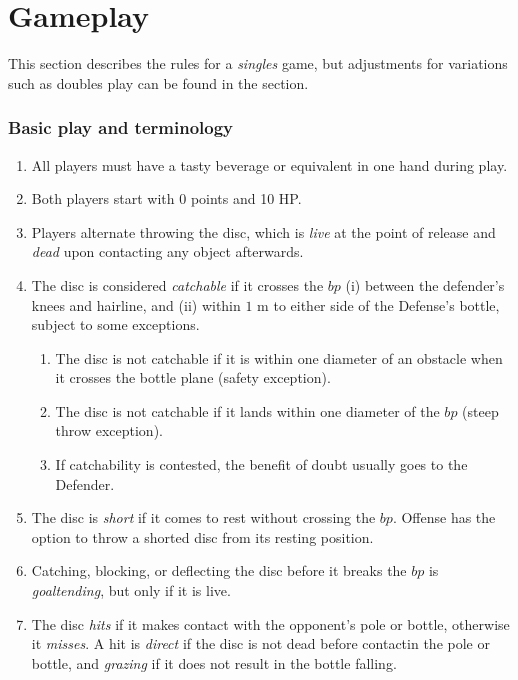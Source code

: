 \documentclass[11pt,letterpaper,twocolumn,english,DIV=calc]{scrartcl}
\begin{document}
\part*{Gameplay}

This section describes the rules for a \emph{singles} game, but adjustments for variations such as doubles play can be found in the  section.
	
\section{Basic play and terminology}
\begin{enumerate}
	\item All players must have a tasty beverage or equivalent in one hand during play.
	\item Both players start with 0 points and 10 HP.
	\item \label{enu:alternate_throws} Players alternate throwing the disc, which is \emph{live} at the point of release and \emph{dead} upon contacting any object afterwards.

	\item The disc is considered \emph{catchable} if it crosses the $bp$ (i) between the defender's knees and hairline, and (ii) within $1\mbox{ m}$ to either side of the Defense's bottle, subject to some exceptions.
	\begin{enumerate}
		\item The disc is not catchable if it is within one diameter of an obstacle when it crosses the bottle plane (safety exception).
		\item The disc is not catchable if it lands within one diameter of the $bp$ (steep throw exception).
		\item If catchability is contested, the benefit of doubt usually goes to the Defender.
	\end{enumerate}

	\item The disc is \emph{short} if it comes to rest without crossing the $bp$. 
		Offense has the option to throw a shorted disc from its resting position. 

	\item Catching, blocking, or deflecting the disc before it breaks the $bp$ is \emph{goaltending}, but only if it is live.
	
	\item The disc \emph{hits} if it makes contact with the opponent's pole or bottle, otherwise it \emph{misses}.
	A hit is \emph{direct} if the disc is not dead before contactin the pole or bottle, and \emph{grazing} if it does not result in the bottle falling.

\end{enumerate}
\end{document}
